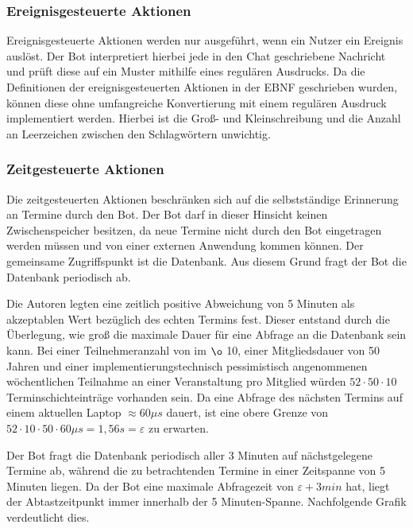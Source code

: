 \subsubsection{Ereignisgesteuerte Aktionen}

Ereignisgesteuerte Aktionen werden nur ausgeführt, wenn ein Nutzer ein Ereignis auslöst. Der Bot interpretiert hierbei jede in den Chat geschriebene Nachricht und prüft diese auf ein Muster mithilfe eines regulären Ausdrucks. Da die Definitionen der ereignisgesteuerten Aktionen in der EBNF geschrieben wurden, können diese ohne umfangreiche Konvertierung mit einem regulären Ausdruck implementiert werden. Hierbei ist die Groß- und Kleinschreibung und die Anzahl an Leerzeichen zwischen den Schlagwörtern unwichtig.

\subsubsection{Zeitgesteuerte Aktionen}

Die zeitgesteuerten Aktionen beschränken sich auf die selbstständige Erinnerung an Termine durch den Bot. Der Bot darf in dieser Hinsicht keinen Zwischenspeicher besitzen, da neue Termine nicht durch den Bot eingetragen werden müssen und von einer externen Anwendung kommen können. Der gemeinsame Zugriffspunkt ist die Datenbank. Aus diesem Grund fragt der Bot die Datenbank periodisch ab.

Die Autoren legten eine zeitlich positive Abweichung von 5 Minuten als akzeptablen Wert bezüglich des echten Termins fest. Dieser entstand durch die Überlegung, wie groß die maximale Dauer für eine Abfrage an die Datenbank sein kann. Bei einer Teilnehmeranzahl von im $\o$ 10, einer Mitgliedsdauer von 50 Jahren und einer implementierungstechnisch pessimistisch angenommenen wöchentlichen Teilnahme an einer Veranstaltung pro Mitglied würden $52 \cdot 50 \cdot 10$ Terminschichteinträge vorhanden sein. Da eine Abfrage des nächsten Termins auf einem aktuellen Laptop $\approx 60\mu s$ dauert, ist eine obere Grenze von $52 \cdot 10 \cdot 50 \cdot 60 \mu s=1,56s=\varepsilon $ zu erwarten.

Der Bot fragt die Datenbank periodisch aller 3 Minuten auf nächstgelegene Termine ab, während die zu betrachtenden Termine in einer Zeitspanne von 5 Minuten liegen. Da der Bot eine maximale Abfragezeit von $\varepsilon + 3min$ hat, liegt der Abtastzeitpunkt immer innerhalb der 5 Minuten-Spanne. Nachfolgende Grafik verdeutlicht dies.



